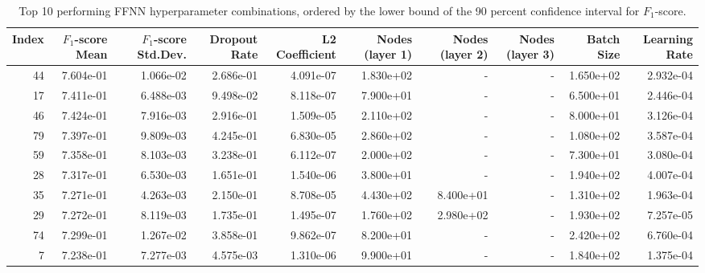\begin{table}
\caption{Top 10 performing FFNN hyperparameter combinations, ordered by the lower bound of the 90 percent confidence interval for $F_1$-score.}
\label{tab:05_best_FFNN_hpars}
\begin{adjustbox}{width=1\textwidth}
\begin{tabular}{rrrrrrrrrr}
\toprule
Index & $F_1$-score Mean & $F_1$-score Std.Dev. & Dropout Rate & L2 Coefficient & Nodes (layer 1) & Nodes (layer 2) & Nodes (layer 3) & Batch Size & Learning Rate \\
\midrule
44 & 7.604e-01 & 1.066e-02 & 2.686e-01 & 4.091e-07 & 1.830e+02 & - & - & 1.650e+02 & 2.932e-04 \\
17 & 7.411e-01 & 6.488e-03 & 9.498e-02 & 8.118e-07 & 7.900e+01 & - & - & 6.500e+01 & 2.446e-04 \\
46 & 7.424e-01 & 7.916e-03 & 2.916e-01 & 1.509e-05 & 2.110e+02 & - & - & 8.000e+01 & 3.126e-04 \\
79 & 7.397e-01 & 9.809e-03 & 4.245e-01 & 6.830e-05 & 2.860e+02 & - & - & 1.080e+02 & 3.587e-04 \\
59 & 7.358e-01 & 8.103e-03 & 3.238e-01 & 6.112e-07 & 2.000e+02 & - & - & 7.300e+01 & 3.080e-04 \\
28 & 7.317e-01 & 6.530e-03 & 1.651e-01 & 1.540e-06 & 3.800e+01 & - & - & 1.940e+02 & 4.007e-04 \\
35 & 7.271e-01 & 4.263e-03 & 2.150e-01 & 8.708e-05 & 4.430e+02 & 8.400e+01 & - & 1.310e+02 & 1.963e-04 \\
29 & 7.272e-01 & 8.119e-03 & 1.735e-01 & 1.495e-07 & 1.760e+02 & 2.980e+02 & - & 1.930e+02 & 7.257e-05 \\
74 & 7.299e-01 & 1.267e-02 & 3.858e-01 & 9.862e-07 & 8.200e+01 & - & - & 2.420e+02 & 6.760e-04 \\
7 & 7.238e-01 & 7.277e-03 & 4.575e-03 & 1.310e-06 & 9.900e+01 & - & - & 1.840e+02 & 1.375e-04 \\
\bottomrule
\end{tabular}
\end{adjustbox}
\end{table}
